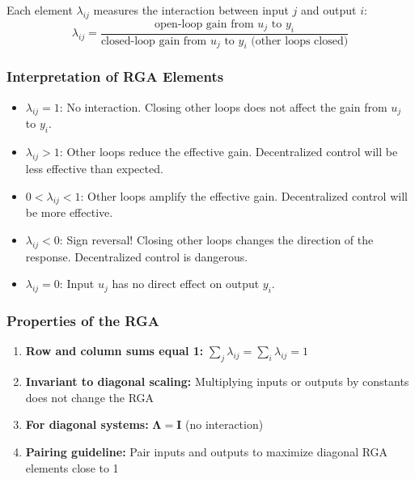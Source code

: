 Each element $\lambda_{ij}$ measures the interaction between input $j$ and output $i$:
\begin{equation}
\lambda_{ij} = \frac{\text{open-loop gain from } u_j \text{ to } y_i}{\text{closed-loop gain from } u_j \text{ to } y_i \text{ (other loops closed)}}
\end{equation}

\subsubsection{Interpretation of RGA Elements}

\begin{itemize}
\item $\lambda_{ij} = 1$: No interaction. Closing other loops does not affect the gain from $u_j$ to $y_i$.

\item $\lambda_{ij} > 1$: Other loops reduce the effective gain. Decentralized control will be less effective than expected.

\item $0 < \lambda_{ij} < 1$: Other loops amplify the effective gain. Decentralized control will be more effective.

\item $\lambda_{ij} < 0$: Sign reversal! Closing other loops changes the direction of the response. Decentralized control is dangerous.

\item $\lambda_{ij} = 0$: Input $u_j$ has no direct effect on output $y_i$.
\end{itemize}

\subsubsection{Properties of the RGA}

\begin{enumerate}
\item \textbf{Row and column sums equal 1:} $\sum_j \lambda_{ij} = \sum_i \lambda_{ij} = 1$

\item \textbf{Invariant to diagonal scaling:} Multiplying inputs or outputs by constants does not change the RGA

\item \textbf{For diagonal systems:} $\boldsymbol{\Lambda} = \mathbf{I}$ (no interaction)

\item \textbf{Pairing guideline:} Pair inputs and outputs to maximize diagonal RGA elements close to 1
\end{enumerate}

